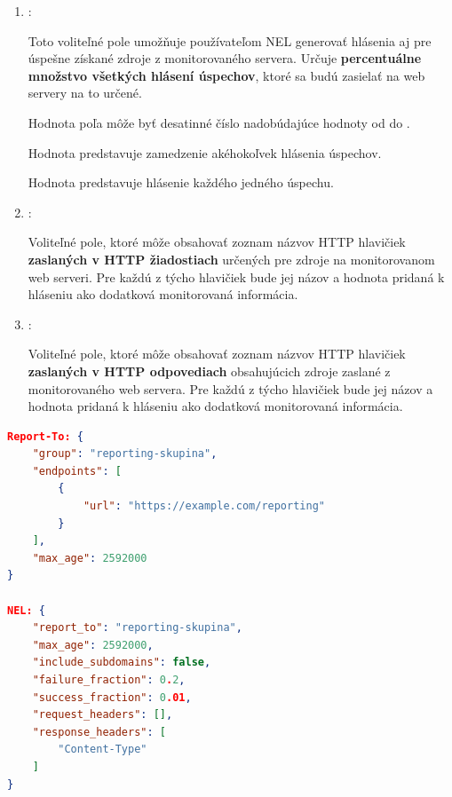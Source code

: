 \begin{enumerate}
    \item {}:

    Toto voliteľné pole umožňuje používateľom NEL generovať hlásenia aj pre úspešne získané zdroje z monitorovaného servera. Určuje \textbf{percentuálne množstvo všetkých hlásení úspechov}, ktoré sa budú zasielať na web servery na to určené.

    Hodnota poľa môže byť desatinné číslo nadobúdajúce hodnoty od  do .
    
    Hodnota  predstavuje zamedzenie akéhokoľvek hlásenia úspechov. 
    
    Hodnota  predstavuje hlásenie každého jedného úspechu.

    \pagebreak
    
    \item {}:

    Voliteľné pole, ktoré môže obsahovať zoznam názvov HTTP hlavičiek \textbf{zaslaných v HTTP žiadostiach} určených pre zdroje na monitorovanom web serveri. 
    Pre každú z týcho hlavičiek bude jej názov a hodnota pridaná k hláseniu ako dodatková monitorovaná informácia.
    
    \item {}:

    Voliteľné pole, ktoré môže obsahovať zoznam názvov HTTP hlavičiek \textbf{zaslaných v HTTP odpovediach} obsahujúcich zdroje zaslané z monitorovaného web servera. 
    Pre každú z týcho hlavičiek bude jej názov a hodnota pridaná k hláseniu ako dodatková monitorovaná informácia.
\end{enumerate}


\begin{center}
\centering
\begin{lstlisting}[caption={\centering Príklad použitia NEL. Zaslané hlavičky týchto dvoch technológií spolupracujú tak, že Reporting API skupinu \code{group} referencuje hlavička NEL svojim poľom \code{report\_to}. Obe pravidlá majú rovnako dlhú platnosť. Hlásenia zlyhaní, ale aj úspechov sa budú tvoriť iba pre \textbf{domény} monitorovaného web servera podľa ich samostatne upravených percentuálnych nastavení. Ako dodatková informácia v hláseniach bude figurovať hlavička \code{Content-Type} z odpovedí monitorovaného web servera. Štruktúra hlásení generovaných tymito pravidlami je popísaná v sekcii \ref{struktura-hlasenia-nel} s konkrétnym \mbox{príkladom hlásenia vo výpise \ref{listing:priklad-nel-report}.}},
label=listing:priklad-nel-header, 
language=json, 
frame=tb,
xleftmargin=.1\textwidth, 
xrightmargin=.1\textwidth]
Report-To: {
    "group": "reporting-skupina",
    "endpoints": [
        {
            "url": "https://example.com/reporting"
        }
    ],
    "max_age": 2592000
}

NEL: {
    "report_to": "reporting-skupina",
    "max_age": 2592000,
    "include_subdomains": false,
    "failure_fraction": 0.2,
    "success_fraction": 0.01,
    "request_headers": [],
    "response_headers": [
        "Content-Type"
    ]
}
\end{lstlisting}
\end{center}


